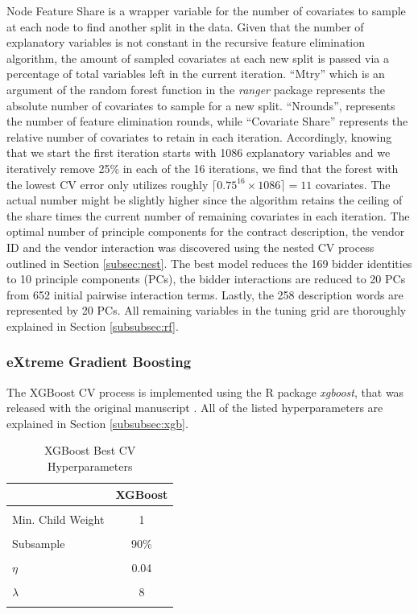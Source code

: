 \documentclass[a4paper,12pt, headsepline]{scrartcl}
\numberwithin{equation}{section}
\begin{document}
Node Feature Share is a wrapper variable for the number of covariates to sample at each node to find another split in the data. Given that the number of explanatory variables is not constant in the recursive feature elimination algorithm, the amount of sampled covariates at each new split is passed via a percentage of total variables left in the current iteration. \enquote{Mtry} which is an argument of the random forest function in the \textit{ranger} package represents the absolute number of covariates to sample for a new split. \enquote{Nrounds}, represents the number of feature elimination rounds, while \enquote{Covariate Share} represents the relative number of covariates to retain in each iteration. Accordingly, knowing that we start the first iteration starts with 1086 explanatory variables and we iteratively remove 25\% in each of the 16 iterations, we find that the forest with the lowest CV error only utilizes roughly $\lceil 0.75^{16} \times 1086\rceil = 11$ covariates. The actual number might be slightly higher since the algorithm retains the ceiling of the share times the current number of remaining covariates in each iteration. The optimal number of principle components for the contract description, the vendor ID and the vendor interaction was discovered using the nested CV process outlined in Section \ref{subsec:nest}. The best model reduces the 169 bidder identities to 10 principle components (PCs), the bidder interactions are reduced to 20 PCs from 652 initial pairwise interaction terms. Lastly, the 258 description words are represented by 20 PCs. All remaining variables in the tuning grid are thoroughly explained in Section \ref{subsubsec:rf}.

\subsubsection{eXtreme Gradient Boosting}
The XGBoost CV process is implemented using the R package \textit{xgboost}, that was released with the original manuscript \citep{xgboost}. All of the listed hyperparameters are explained in Section \ref{subsubsec:xgb}.

\begin{table}[H]
	\centering
	\begin{tabular}[t]{lc}
		\toprule
		& XGBoost\\
		\midrule
		\cellcolor{gray!6}{$N_{iter}$} & \cellcolor{gray!6}{338}\\
		Min. Child Weight & 1\\
		\cellcolor{gray!6}{Max. Depth} & \cellcolor{gray!6}{7}\\
		Subsample & 90\%\\
		\cellcolor{gray!6}{Colsample by Tree} & \cellcolor{gray!6}{90\%}\\
		$\eta$ & 0.04\\
		\cellcolor{gray!6}{$\gamma$} & \cellcolor{gray!6}{0.01}\\
		$\lambda$ & 8\\
		\cellcolor{gray!6}{$\alpha$} & \cellcolor{gray!6}{3}\\
		\bottomrule
	\end{tabular}
	\caption{XGBoost Best CV Hyperparameters}\label{tab:xgb}
\end{table}
\end{document}
